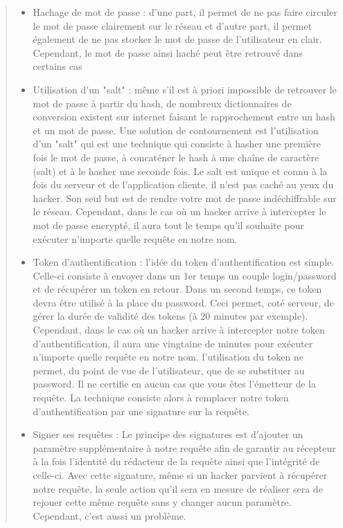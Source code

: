 \documentclass{report}
\begin{document}
\begin{quotation}
  \noindent
\begin{itemize}
\item Hachage de mot de passe : d'une part, il permet de ne pas faire circuler le mot de passe clairement sur le réseau et 
d'autre part, il permet également de ne pas stocker le mot de passe de l’utilisateur en clair. Cependant, le mot de passe ainsi haché peut être retrouvé dans certains cas
\item Utilisation d’un "salt" : même s'il est à priori impossible de retrouver le mot de passe à partir du hash, de 
nombreux dictionnaires de conversion existent sur internet faisant le rapprochement entre un hash et un mot de passe.
Une solution de contournement est l'utilisation d'un "salt" qui est une technique qui consiste à hasher une première fois 
le mot de passe, à concaténer le hash à une chaîne de caractère (salt) et à le hasher une seconde fois. Le salt est unique 
et connu à la fois du serveur et de l’application cliente, il n’est pas caché au yeux du hacker. Son seul but est de rendre 
votre mot de passe indéchiffrable sur le réseau. Cependant, dans le cas où un hacker arrive à intercepter le mot de passe encrypté, il aura tout le temps qu’il souhaite pour exécuter n’importe quelle requête en notre nom.
\item Token d’authentification : l’idée du token d’authentification est simple. Celle-ci consiste à envoyer dans un 1er temps un couple login/password et de récupérer un token en retour. Dans un second temps, ce token devra être utilisé 
à la place du password. Ceci permet, coté serveur, de gérer la durée de validité des tokens (à 20 minutes par exemple). 
Cependant, dans le cas où un hacker arrive à intercepter notre token d’authentification, il aura une vingtaine de 
minutes pour exécuter n’importe quelle requête en notre nom. l’utilisation du token ne permet, du point de vue de l’utilisateur, que de se substituer au password. Il ne certifie en aucun cas que vous êtes l’émetteur de la requête. La technique consiste alors à remplacer notre token d’authentification par une signature sur la requête. 
\item Signer ses requêtes : Le principe des signatures est d’ajouter un paramètre supplémentaire à notre requête afin de
garantir au récepteur à la fois l’identité du rédacteur de la requête ainsi que l’intégrité de celle-ci. Avec cette signature, 
même si un hacker parvient à récupérer notre requête, la seule action qu’il sera en mesure de réaliser sera de rejouer 
cette même requête sans y changer aucun paramètre. Cependant, c'est aussi un problème.

\end{itemize}
\end{quotation}
\end{document}
